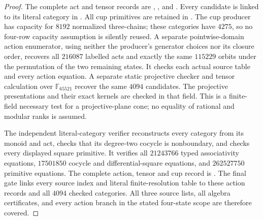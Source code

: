 \begin{proof}
The complete act and tensor records are
,
, and
.
Every candidate is linked to its literal category in
.
All cup primitives are retained in
.
The cup producer has capacity for $8192$ normalized three-chains;
these categories have $4275$, so no four-row capacity assumption
is silently reused.
A separate pointwise-domain action enumerator, using neither the
producer's generator choices nor its closure order, recovers all
$216087$ labelled acts and exactly the same $115229$ orbits under
the permutation of the two remaining states.  It checks each actual
source table and every action equation.  A separate static projective
checker and tensor calculation over $\mathbb F_{65521}$ recover the
same $4094$ candidates.  The projective presentations and their exact
kernels are checked in that field.  This is a finite-field necessary
test for a projective-plane cone; no equality of rational and modular
ranks is assumed.

The independent literal-category verifier reconstructs every category
from its monoid and act, checks that its degree-two cocycle is
nonboundary, and checks every displayed square primitive.  It
verifies all $21243766$ typed associativity equations, $17501850$
cocycle and differential-square equations, and $262527750$ primitive
equations.  The complete action, tensor and cup record is
.
The final gate
links every source index and literal finite-resolution table to
these action records and all $4094$ checked categories.  All three
source lists, all algebra certificates, and every action branch in
the stated four-state scope are therefore covered.
\end{proof}
